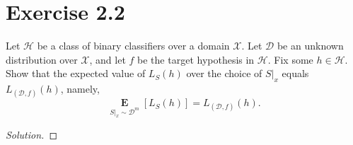 \documentclass[10pt, a4paper, twoside]{amsart}
\DeclarePairedDelimiter\abs{\lvert}{\rvert}
\DeclarePairedDelimiter\cbrac\{\}
\renewcommand{\c}{\ensuremath{\colon}}
\newcommand{\Ind}{\ensuremath{\mathbb{1}}}
\renewcommand{\P}{\operatorname*{\ensuremath{\mathbf{P}}}}
\newcommand{\Ev}{\operatorname*{\ensuremath{\mathbf{E}}}}
\newenvironment{solution}
               {\let\oldqedsymbol=\qedsymbol
                \renewcommand{\qedsymbol}{$\blacktriangleleft$}
                \begin{proof}[Solution]}
               {\end{proof}
                \renewcommand{\qedsymbol}{\oldqedsymbol}}
\newcommand{\TODO}{\textcolor{red}{\textbf{!!!!!! }}}
\begin{document}
\section*{Exercise 2.2}
Let $\mathcal{H}$ be a class of binary classifiers over a domain $\mathcal{X}$. 
Let $\mathcal{D}$ be an unknown distribution over $\mathcal{X}$, and let $f$ be the target hypothesis in $\mathcal{H}$. 
Fix some $h \in \mathcal{H}$. Show that the expected value of $L_S(h)$ over the choice of $S|_x$ equals $L_{(\mathcal{D},f)}(h)$,
namely,
\begin{equation*}
\Ev_{S|_{x}\sim \mathcal{D}^m} [L_S(h)]=L_{(\mathcal{D},f)}(h).
\end{equation*}
\begin{solution}
% 
% 
% 
% 
% 


\end{solution}
\end{document}
